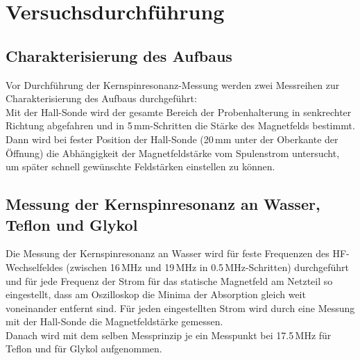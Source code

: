 \section{Versuchsdurchführung}




\subsection*{Charakterisierung des Aufbaus}
Vor Durchführung der Kernspinresonanz-Messung werden
zwei Messreihen zur Charakterisierung des Aufbaus durchgeführt:\\
Mit der Hall-Sonde wird der gesamte Bereich der Probenhalterung in senkrechter
Richtung abgefahren und in 5\,mm-Schritten die Stärke des Magnetfelds bestimmt.\\
Dann wird bei fester Position der Hall-Sonde (20\,mm unter der Oberkante der Öffnung) die Abhängigkeit
der Magnetfeldstärke vom Spulenstrom untersucht,
um später schnell gewünschte Feldstärken einstellen zu können.

\subsection*{Messung der Kernspinresonanz an Wasser, Teflon und Glykol}
Die Messung der Kernspinresonanz an Wasser wird für feste Frequenzen des HF-Wechselfeldes
(zwischen 16\,MHz und 19\,MHz in 0.5\,MHz-Schritten)
durchgeführt und für jede Frequenz der Strom für das statische Magnetfeld am Netzteil so eingestellt,
dass am Oszilloskop die Minima der Absorption gleich weit voneinander entfernt sind.
Für jeden eingestellten Strom wird durch eine Messung mit der Hall-Sonde die Magnetfeldstärke gemessen.\\
Danach wird mit dem selben Messprinzip je ein Messpunkt bei 17.5\,MHz für Teflon und für Glykol aufgenommen.
